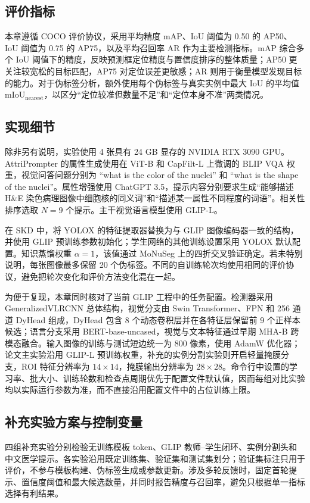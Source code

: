 \subsection{评价指标}

本章遵循 COCO 评价协议，采用平均精度 mAP、IoU 阈值为 0.50 的 AP50、IoU 阈值为 0.75 的 AP75，以及平均召回率 AR 作为主要检测指标。mAP 综合多个 IoU 阈值下的精度，反映预测框定位精度与置信度排序的整体质量；AP50 更关注较宽松的目标匹配，AP75 对定位误差更敏感；AR 则用于衡量模型发现目标的能力。对于伪标签分析，额外使用每个伪标签与真实实例中最大 IoU 的平均值 $\mathrm{mIoU}_{\mathrm{nearest}}$，以区分“定位较准但数量不足”和“定位本身不准”两类情况。

\subsection{实现细节}

除非另有说明，实验使用 4 张具有 24 GB 显存的 NVIDIA RTX 3090 GPU。AttriPrompter 的属性生成使用在 ViT-B 和 CapFilt-L 上微调的 BLIP VQA 权重，视觉问答问题分别为 ``what is the color of the nuclei'' 和 ``what is the shape of the nuclei''。属性增强使用 ChatGPT 3.5，提示内容分别要求生成“能够描述 H\&E 染色病理图像中细胞核的同义词”和“描述某一属性不同程度的词语”。相关性排序选取 $N=9$ 个提示。主干视觉语言模型使用 GLIP-L。

在 SKD 中，将 YOLOX 的特征提取器替换为与 GLIP 图像编码器一致的结构，并使用 GLIP 预训练参数初始化；学生网络的其他训练设置采用 YOLOX 默认配置。知识蒸馏权重 $\alpha=1$，该值通过 MoNuSeg 上的四折交叉验证确定。若未特别说明，每张图像最多保留 20 个伪标签。不同的自训练轮次均使用相同的评价协议，避免把轮次变化和评价方法变化混在一起。

为便于复现，本章同时核对了当前 GLIP 工程中的任务配置。检测器采用 GeneralizedVLRCNN 总体结构，视觉分支由 Swin Transformer、FPN 和 256 通道 DyHead 组成，DyHead 包含 8 个动态卷积层并在各特征层保留前 9 个正样本候选；语言分支采用 BERT-base-uncased，视觉与文本特征通过早期 MHA-B 跨模态融合。输入图像的训练与测试短边统一为 800 像素，使用 AdamW 优化器；论文主实验沿用 GLIP-L 预训练权重，补充的实例分割实验则开启轻量掩膜分支，ROI 特征分辨率为 $14\times14$，掩膜输出分辨率为 $28\times28$。命令行中设置的学习率、批大小、训练轮数和检查点周期优先于配置文件默认值，因而每组对比实验均以实际运行参数为准，而不直接沿用配置文件中的占位训练上限。

\subsection{补充实验方案与控制变量}
四组补充实验分别检验无训练模板 token、GLIP 教师--学生闭环、实例分割头和中文医学提示。各实验沿用既定训练集、验证集和测试集划分；验证集标注只用于评价，不参与模板构建、伪标签生成或参数更新。涉及多轮反馈时，固定首轮提示、置信度阈值和最大候选数量，并同时报告精度与召回率，避免只根据单一指标选择有利结果。

